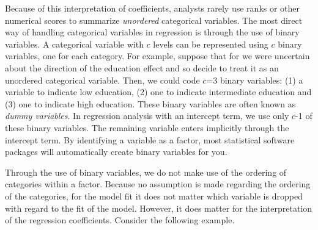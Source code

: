 Because of this interpretation of coefficients, analysts rarely use
ranks or other numerical scores to summarize \emph{unordered}
categorical variables. The most direct way of handling categorical
variables in regression is through the use of binary variables. A
categorical variable with $c$ levels can be represented using $c$
binary variables, one for each category. For example, suppose that
for we were uncertain about the direction of the education effect
and so decide to treat it as an unordered categorical variable.
Then, we could code $c$=3 binary variables: (1) a variable to
indicate low education, (2) one to indicate intermediate education
and (3) one to indicate high education. These binary variables are
often known as \emph{dummy variables}. In regression analysis with
an intercept term, we use only $c$-1 of these binary variables. The
remaining variable enters implicitly through the intercept term. By
identifying a variable as a factor, most statistical software
packages will automatically create binary variables for you.

Through the use of binary variables, we do not make use of the
ordering of categories within a factor. Because no assumption is
made regarding the ordering of the categories, for the model fit it
does not matter which variable is dropped with regard to the fit of
the model. However, it does matter for the interpretation of the
regression coefficients. Consider the following example.

\bigskip

\linejed


